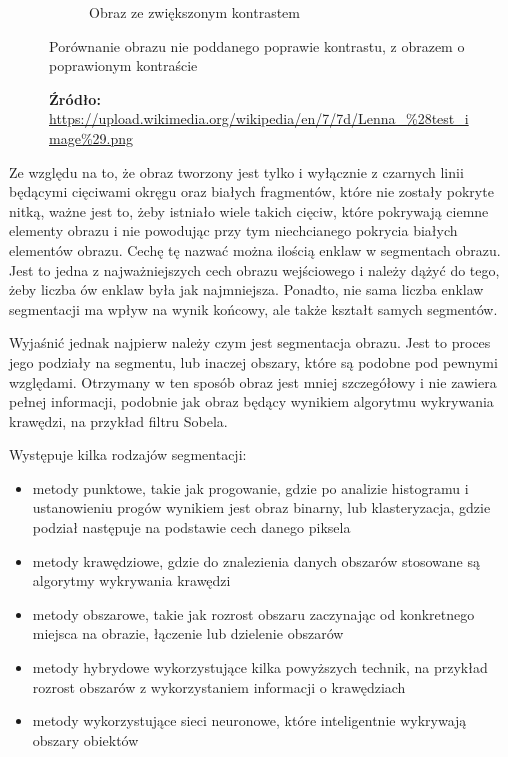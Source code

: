 \documentclass[a4paper, 12pt, polish, twoside]{extreport}
\begin{document}
\begin{figure}[H]
\begin{subfigure}{0.49\textwidth}
                \caption{Obraz ze zwiększonym kontrastem}
                \label{theory-contrast-lenna-b}
            \end{subfigure}
            \caption{Porównanie obrazu nie poddanego poprawie kontrastu, z obrazem o poprawionym kontraście}
            \caption*{\footnotesize{\textbf{Źródło:} {\url{https://upload.wikimedia.org/wikipedia/en/7/7d/Lenna_\%28test_image\%29.png}}}}
            \label{theory-contrast-lenna}
        \end{figure}
        
        Ze względu na to, że obraz tworzony jest tylko i wyłącznie z czarnych linii będącymi cięciwami okręgu oraz białych fragmentów, które nie zostały pokryte nitką, ważne jest to, żeby istniało wiele takich cięciw, które pokrywają ciemne elementy obrazu i nie powodując przy tym niechcianego pokrycia białych elementów obrazu. Cechę tę nazwać można ilością enklaw w segmentach obrazu. Jest to jedna z najważniejszych cech obrazu wejściowego i należy dążyć do tego, żeby liczba ów enklaw była jak najmniejsza. Ponadto, nie sama liczba enklaw segmentacji ma wpływ na wynik końcowy, ale także kształt samych segmentów.
        
        Wyjaśnić jednak najpierw należy czym jest segmentacja obrazu. Jest to proces jego podziały na segmentu, lub inaczej obszary, które są podobne pod pewnymi względami. Otrzymany w ten sposób obraz jest mniej szczegółowy i nie zawiera pełnej informacji, podobnie jak obraz będący wynikiem algorytmu wykrywania krawędzi, na przykład filtru Sobela.
        
        Występuje kilka rodzajów segmentacji:
       \begin{itemize}
            \item metody punktowe, takie jak progowanie, gdzie po analizie histogramu i ustanowieniu progów wynikiem jest obraz binarny, lub klasteryzacja, gdzie podział następuje na podstawie cech danego piksela
            \item metody krawędziowe, gdzie do znalezienia danych obszarów stosowane są algorytmy wykrywania krawędzi 
            \item metody obszarowe, takie jak rozrost obszaru zaczynając od konkretnego miejsca na obrazie, łączenie lub dzielenie obszarów
            \item metody hybrydowe wykorzystujące kilka powyższych technik, na przykład rozrost obszarów z wykorzystaniem informacji o krawędziach
            \item metody wykorzystujące sieci neuronowe, które inteligentnie wykrywają obszary obiektów
        \end{itemize}
\end{document}
